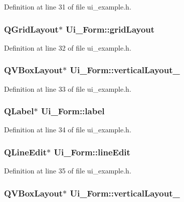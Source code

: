 Definition at line 31 of file ui\_\-example.h.\hypertarget{classUi__Form_ae98d1b7c9973f749fe480cf5eb2f7fc}{
\subsubsection{\setlength{\rightskip}{0pt plus 5cm}QGridLayout$\ast$ {\bf Ui\_\-Form::gridLayout}}}
\label{classUi__Form_ae98d1b7c9973f749fe480cf5eb2f7fc}




Definition at line 32 of file ui\_\-example.h.\hypertarget{classUi__Form_7fe6aa5ca842136f57bc8d270d5242a0}{
\subsubsection{\setlength{\rightskip}{0pt plus 5cm}QVBoxLayout$\ast$ {\bf Ui\_\-Form::verticalLayout\_}}}
\label{classUi__Form_7fe6aa5ca842136f57bc8d270d5242a0}




Definition at line 33 of file ui\_\-example.h.\hypertarget{classUi__Form_88987158471feff085512376ebfc3001}{
\subsubsection{\setlength{\rightskip}{0pt plus 5cm}QLabel$\ast$ {\bf Ui\_\-Form::label}}}
\label{classUi__Form_88987158471feff085512376ebfc3001}




Definition at line 34 of file ui\_\-example.h.\hypertarget{classUi__Form_3a0c19a5e180e3638a6ca0ba1a63e80e}{
\subsubsection{\setlength{\rightskip}{0pt plus 5cm}QLineEdit$\ast$ {\bf Ui\_\-Form::lineEdit}}}
\label{classUi__Form_3a0c19a5e180e3638a6ca0ba1a63e80e}




Definition at line 35 of file ui\_\-example.h.\hypertarget{classUi__Form_1b66aafcaf277c283656d8c690bd2ca5}{
\subsubsection{\setlength{\rightskip}{0pt plus 5cm}QVBoxLayout$\ast$ {\bf Ui\_\-Form::verticalLayout\_}}}
\label{classUi__Form_1b66aafcaf277c283656d8c690bd2ca5}




